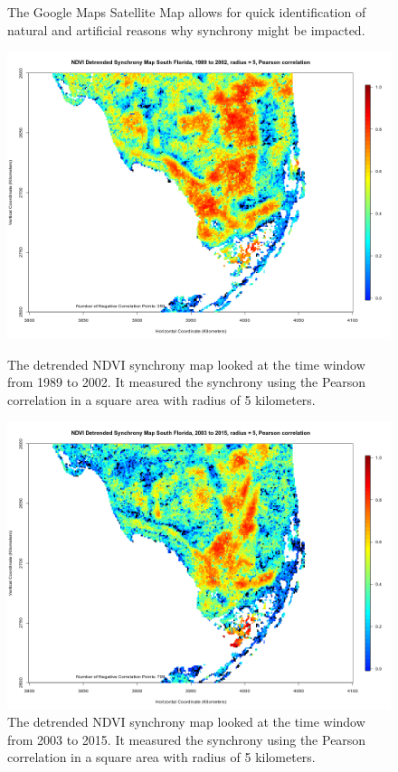 \documentclass[11pt,reqno, twoside]{amsart}
\theoremstyle{plain}  %
\theoremstyle{definition}
\numberwithin{figure}{section}
\numberwithin{equation}{section}
\begin{document}
\begin{figure}[H]
\begin{minipage}[b]{0.5\linewidth}
    \caption{The Google Maps Satellite Map allows for quick identification of natural and artificial reasons why synchrony might be impacted.} 
    \vspace{4ex}
  \end{minipage} 
  \begin{minipage}[b]{0.5\linewidth}
    \centering
    \includegraphics[width=1.1\linewidth]{images/NDVIDetrendedSynchronyMap_SouthFlorida_1989to2002_r5_Pearson.png} 
    \caption{The detrended NDVI synchrony map looked at the time window from 1989 to 2002. It measured the synchrony using the Pearson correlation in a square area with radius of 5 kilometers.} 
    \vspace{4ex}
  \end{minipage}%
  \begin{minipage}[b]{0.5\linewidth}
    \centering
    \includegraphics[width=1.1\linewidth]{images/NDVIDetrendedSynchronyMap_SouthFlorida_2003to2015_r5_Pearson.png} 
    \caption{The detrended NDVI synchrony map looked at the time window from 2003 to 2015. It measured the synchrony using the Pearson correlation in a square area with radius of 5 kilometers.} 
    \vspace{4ex}
  \end{minipage} 
\end{figure}
\end{document}
